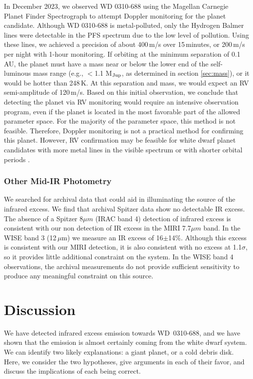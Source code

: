 \documentclass[twocolumn]{aastex631}
\begin{document}
In December 2023, we observed WD 0310-688 using the Magellan Carnegie Planet Finder Spectrograph \citep[PFS; ][]{2006SPIE.6269E..31C,2008SPIE.7014E..79C,2010SPIE.7735E..53C} to attempt Doppler monitoring for the planet candidate. Although WD 0310-688 is metal-polluted, only the Hydrogen Balmer lines were detectable in the PFS spectrum due to the low level of pollution. Using these lines, we achieved a precision of about 400\,m/s over 15\,minutes, or 200\,m/s per night with 1-hour monitoring. If orbiting at the minimum separation of 0.1\,AU, the planet must have a mass near or below the lower end of the self-luminous mass range (e.g., $<$1.1 M$_{\rm Jup}$, as determined in section \ref{sec:mass}), or it would be hotter than 248\,K. At this separation and mass, we would expect an RV semi-amplitude of 120\,m/s. Based on this initial observation, we conclude that detecting the planet via RV monitoring would require an intensive observation program, even if the planet is located in the most favorable part of the allowed parameter space. For the majority of the parameter space, this method is not feasible. Therefore, Doppler monitoring is not a practical method for confirming this planet.
%
However, RV confirmation may be feasible for white dwarf planet candidates with more metal lines in the visible spectrum or with shorter orbital periods \citep{2024MNRAS.527..977R}.



\subsubsection{Other Mid-IR Photometry}

We searched for archival data that could aid in illuminating the source of the infrared excess. We find that archival Spitzer data show no detectable IR excess. The absence of a Spitzer 8$\mu m$ (IRAC band 4) detection of infrared excess \citep{2007ApJS..171..206M} is consistent with our non detection of IR excess in the MIRI 7.7$\mu m$ band. In the WISE band 3 (12\,$\mu$m) we measure an IR excess of 16$\pm$14\%. Although this excess is consistent with our MIRI detection, it is also consistent with no excess at 1.1$\sigma$, so it provides little additional constraint on the system. In the WISE band 4 observations, the archival measurements do not provide sufficient sensitivity to produce any meaningful constraint on this source. 





\section{Discussion} \label{sec:discuss}
We have detected infrared excess emission towards WD~0310-688, and we have shown that the emission is almost certainly coming from the white dwarf system. We can identify two likely explanations: a giant planet, or a cold debris disk. Here, we consider the two hypotheses, give arguments in each of their favor, and discuss the implications of each being correct. 
\end{document}
